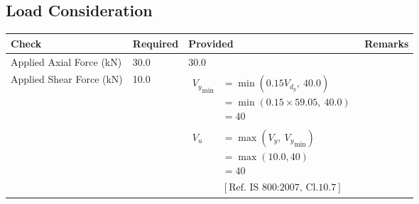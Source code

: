 \documentclass{article}%
\begin{document}
%
%
\subsection{Load Consideration}%
\label{subsec:LoadConsideration}%
\renewcommand{\arraystretch}{1.2}%
\begin{longtable}{|p{4cm}|p{5cm}|p{5.5cm}|p{1.5cm}|}%
\hline%
\rowcolor{OsdagGreen}%
Check&Required&Provided&Remarks\\%
\hline%
\endhead%
\hline%
Applied Axial Force (kN)&30.0&30.0&\textcolor{OsdagGreen}{ 
\textbf{}
}\\%
\hline%
Applied Shear Force (kN)&10.0&$\begin{aligned} {V_{y}}_{\text{min}} &=  \min(0.15 V_{d_y},~ 40.0)\\ & =  \min(0.15 \times59.05,~ 40.0)\\ &=40\\ \\  V_u~~ &= \max(V_{y},~ {V_{y}}_{\text{min}})\\ &=  \max(10.0,40)\\ &=40\\ \\ & [ \text{Ref. IS 800:2007, Cl.10.7}] \end{aligned}$&\textcolor{OsdagGreen}{ 
\textbf{}
}\\%
\hline%
\end{longtable}

%
%
\end{document}
